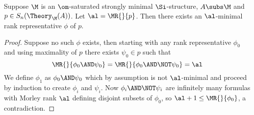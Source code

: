 \begin{lem}
    Suppose $\M$ is an $\om$-saturated strongly minimal $\Si$-structure,
    $A \subs \M$ and $p \in S_n(\Theory_\M(A))$.
    Let $\al = \MR{}{p}$.
    Then there exists an $\al$-minimal rank representative $\phi$ of $p$.
\end{lem}
\begin{proof}
    Suppose no such $\phi$ exists, then starting with any rank representative 
    $\phi_0$ and using maximality of $p$
    there exists $\psi_0 \in p$ such that 
    \[\MR{}{\phi_0 \AND \psi_0} = \MR{}{\phi_0 \AND \NOT \psi_0} = \al\]
    We define $\phi_1$ as $\phi_0 \AND \psi_0$ 
    which by assumption is not $\al$-minimal and proceed by induction 
    to create $\phi_i$ and $\psi_i$.
    Now $\phi_i \AND \NOT \psi_i$ are infinitely 
    many formulas with Morley rank $\al$ defining disjoint subsets of $\phi_0$,
    so $\al + 1 \leq \MR{}{\phi_0}$, a contradiction.
\end{proof}

